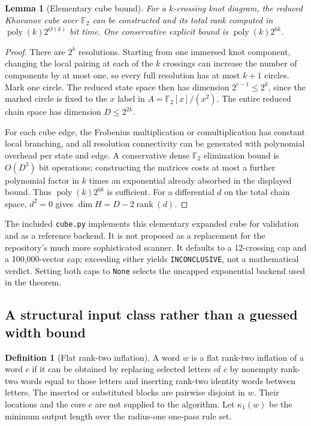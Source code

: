 \documentclass[11pt]{article}
\newtheorem{lemma}[theorem]{Lemma}
\theoremstyle{definition}
\newtheorem{definition}[theorem]{Definition}
\theoremstyle{remark}
\newcommand{\F}{\mathbb F}
\newcommand{\poly}{\operatorname{poly}}
\begin{document}
\begin{lemma}[Elementary cube bound]\label{lem:cube}
For a $k$-crossing knot diagram, the reduced Khovanov cube over $\F_2$ can be
constructed and its total rank computed in $\poly(k)2^{O(k)}$ bit time.
One conservative explicit bound is $\poly(k)2^{6k}$.
\end{lemma}
\begin{proof}
There are $2^k$ resolutions. Starting from one immersed knot component,
changing the local pairing at each of the $k$ crossings can increase the
number of components by at most one, so every full resolution has at most
$k+1$ circles. Mark one circle. The reduced state space then has dimension
$2^{c-1}\le2^k$, since the marked circle is fixed to the $x$ label in
$A=\F_2[x]/(x^2)$. The entire reduced chain space has dimension
$D\le2^{2k}$.

For each cube edge, the Frobenius multiplication or comultiplication has
constant local branching, and all resolution connectivity can be generated
with polynomial overhead per state and edge. A conservative dense
$\F_2$ elimination bound is $O(D^3)$ bit operations; constructing the
matrices costs at most a further polynomial factor in $k$ times an
exponential already absorbed in the displayed bound. Thus
$\poly(k)2^{6k}$ is sufficient. For a differential $d$ on the total chain
space, $d^2=0$ gives $\dim H=D-2\operatorname{rank}(d)$.
\end{proof}

The included \texttt{cube.py} implements this elementary expanded cube for
validation and as a reference backend. It is not proposed as a replacement
for the repository's much more sophisticated scanner. It defaults to a
12-crossing cap and a 100,000-vector cap; exceeding either yields
\texttt{INCONCLUSIVE}, not a mathematical verdict. Setting both caps to
\texttt{None} selects the uncapped exponential backend used in the theorem.

\subsection{A structural input class rather than a guessed width bound}
\begin{definition}[Flat rank-two inflation]
A word $w$ is a flat rank-two inflation of a word $c$ if it can be obtained by
replacing selected letters of $c$ by nonempty rank-two words equal to those
letters and inserting rank-two identity words between letters. The inserted
or substituted blocks are pairwise disjoint in $w$. Their locations and the
core $c$ are not supplied to the algorithm. Let $\kappa_1(w)$ be the minimum
output length over the radius-one one-pass rule set.
\end{definition}
\end{document}
